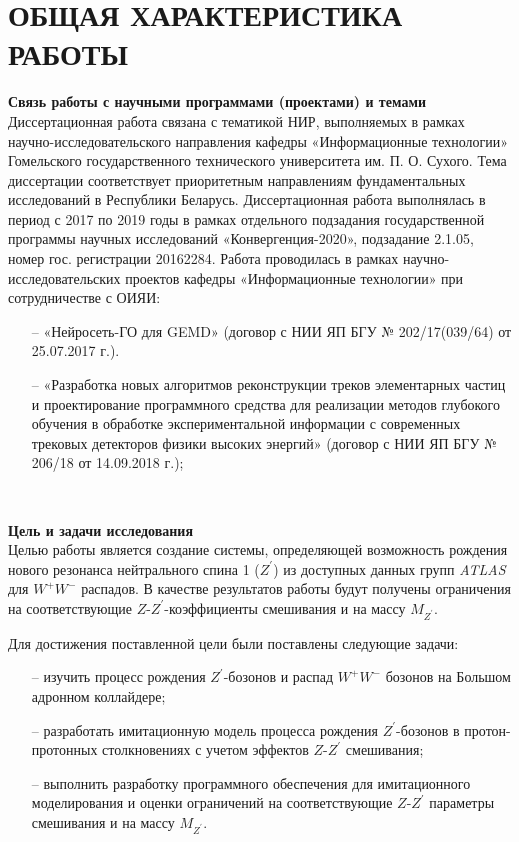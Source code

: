 \chapter*{ОБЩАЯ ХАРАКТЕРИСТИКА РАБОТЫ}
\textbf{Связь работы с научными программами (проектами) и темами}\\

Диссертационная работа связана с тематикой НИР, выполняемых в рамках научно-исследовательского направления кафедры «Информационные технологии» Гомельского государственного технического университета им. П. О. Сухого.
Тема диссертации соответствует приоритетным направлениям
фундаментальных исследований в Республики Беларусь. Диссертационная
работа выполнялась в период с 2017 по 2019 годы в рамках отдельного
подзадания государственной программы научных исследований
«Конвергенция-2020», подзадание 2.1.05, номер гос. регистрации 20162284. Работа проводилась в рамках научно-исследовательских проектов 
кафедры «Информационные технологии» при сотрудничестве с ОИЯИ:  
\begin{enumerate}
	\item[--] «Нейросеть-ГО для GEMD» (договор с НИИ ЯП БГУ № 202/17(039/64)  
	от 25.07.2017 г.).
	\item[--] «Разработка новых алгоритмов реконструкции треков элементарных  
	частиц и проектирование программного средства для реализации методов  
	глубокого обучения в обработке экспериментальной информации с современных  
	трековых детекторов физики высоких энергий» (договор с НИИ ЯП БГУ №  
	206/18 от 14.09.2018 г.);
\end{enumerate}\\

\vspace{16pt}

\textbf{Цель и задачи исследования}\\

Целью работы является создание системы, определяющей возможность рождения нового резонанса нейтрального спина 1 (${Z}^{\prime}$) 
из доступных данных групп \textit{ATLAS} для ${W}^{+}{W}^{-}$ распадов. В качестве результатов работы будут получены 
ограничения на соответствующие $Z$-${Z}^{\prime}$-коэффициенты смешивания и на массу $M_{Z^\prime}$.

Для достижения поставленной цели были поставлены следующие задачи:

\begin{enumerate}
	\item[--] изучить процесс рождения ${Z}^{\prime}$-бозонов и распад ${W}^{+}{W}^{-}$ бозонов на Большом адронном коллайдере;
	
	\item[--] разработать имитационную модель процесса рождения ${Z}^{\prime}$-бозонов в протон-протонных столкновениях с учетом эффектов $Z$-${Z}^{\prime}$ смешивания;
	
	\item[--] выполнить разработку программного обеспечения для имитационного моделирования и оценки ограничений на соответствующие $Z$-${Z}^{\prime}$ параметры смешивания и на массу $M_{Z^\prime}$.
	
\end{enumerate}

